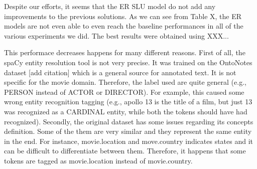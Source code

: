 \documentclass[11pt,a4paper]{article}
\begin{document}
Despite our efforts, it seems that the ER SLU model do not add any improvements to the previous solutions. As we can see from Table X, the ER models are not even able to even reach the baseline performances in all of the various experiments we did. The best results were obtained using XXX...

This performace decreases happens for many different reasons. First of all, the spaCy entity resolution tool is not very precise. It was trained on the OntoNotes dataset [add citation] which is a general source for annotated text. It is not specific for the movie domain. Therefore, the label used are quite general (e.g., PERSON instead of ACTOR or DIRECTOR). For example, this caused some wrong entity recognition tagging (e.g., apollo 13 is the title of a film, but just 13 was recognized as a CARDINAL entity, while both the tokens should have had recognized).
Secondly, the original dataset has some issues regarding its concepts definition. Some of the them are very similar and they represent the same entity in the end. For instance, movie.location and move.country indicates states and it can be difficult to differentiate between them. Therefore, it happens that some tokens are tagged as movie.location instead of movie.country.  




\end{document}
